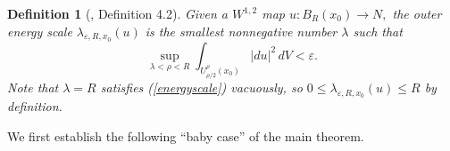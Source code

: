 \documentclass[12pt]{amsart}
\theoremstyle{others}
\newtheorem{defn}[thm]{Definition}
\numberwithin{equation}{section}
\newcommand{\eps}{\varepsilon}
\begin{document}
\begin{defn}[\cite{songwaldron}, Definition 4.2] Given a $W^{1,2}$ map $u: B_R(x_0) \to N,$ the \emph{outer energy scale} $\lambda_{\eps, R, x_0}(u)$ is the smallest nonnegative number $\lambda$ such that
\begin{equation}\label{energyscale}
\sup_{\lambda < \rho < R} \int_{U^{\rho}_{\rho/2}(x_0)} |du|^2 \, dV < \eps.
\end{equation}
Note that $\lambda = R$ satisfies (\ref{energyscale}) vacuously, so $0 \leq \lambda_{\eps, R, x_0}(u) \leq R$ by definition.
\end{defn}
We first establish the following ``baby case'' of the main theorem. %
\end{document}
